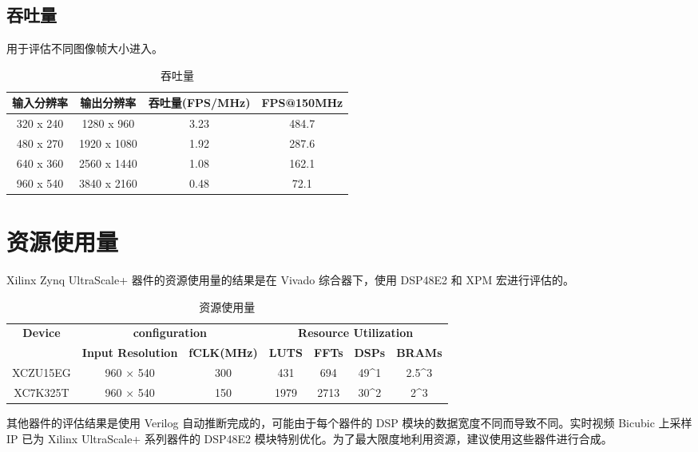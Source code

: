 \documentclass[12pt, a4paper, oneside]{ctexbook}
\begin{document}
		\subsection{吞吐量}
		用于评估不同图像帧大小进入。
		\begin{table}[h]
			\centering
			\begin{tabular}{|c|c|c|c|}
				\hline
				\textbf{输入分辨率} & \textbf{输出分辨率} & \textbf{吞吐量(FPS/MHz)} & \textbf{FPS@150MHz} \\ \hline
				320 x 240      & 1280 x 960     & 3.23                  & 484.7               \\ \hline
				480 x 270      & 1920 x 1080    & 1.92                  & 287.6               \\ \hline
				640 x 360      & 2560 x 1440    & 1.08                  & 162.1               \\ \hline
				960 x 540      & 3840 x 2160    & 0.48                  & 72.1                \\ \hline
			\end{tabular}
		\caption{吞吐量}
		\end{table}
	\section{资源使用量}
	Xilinx Zynq UltraScale+ 器件的资源使用量的结果是在 Vivado 综合器下，使用 DSP48E2 和 XPM 宏进行评估的。
	\par	
	\begin{table}[h]
		\begin{tabular}{|c|cc|cccc|}
			\hline
			\multirow{2}{*}{\textbf{Device}} & \multicolumn{2}{c|}{\textbf{configuration}}                         & \multicolumn{4}{c|}{\textbf{Resource Utilization}}                                                                                            \\ \cline{2-7} 
			& \multicolumn{1}{c|}{\textbf{Input Resolution}} & \textbf{fCLK(MHz)} & \multicolumn{1}{c|}{\textbf{LUTS}} & \multicolumn{1}{c|}{\textbf{FFTs}} & \multicolumn{1}{c|}{\textbf{DSPs}}         & \textbf{BRAMs}         \\ \hline
			XCZU15EG                         & \multicolumn{1}{c|}{960 × 540}                 & 300                & \multicolumn{1}{c|}{431}           & \multicolumn{1}{c|}{694}           & \multicolumn{1}{c|}{49\textasciicircum{}1} & 2.5\textasciicircum{}3 \\ \hline
			XC7K325T                         & \multicolumn{1}{c|}{960 × 540}                 & 150                & \multicolumn{1}{c|}{1979}          & \multicolumn{1}{c|}{2713}          & \multicolumn{1}{c|}{30\textasciicircum{}2} & 2\textasciicircum{}3   \\ \hline
		\end{tabular}
	\caption{资源使用量}
	\end{table}
	其他器件的评估结果是使用 Verilog 自动推断完成的，可能由于每个器件的 DSP 模块的数据宽度不同而导致不同。实时视频 Bicubic 上采样 IP 已为 Xilinx UltraScale+ 系列器件的 DSP48E2 模块特别优化。为了最大限度地利用资源，建议使用这些器件进行合成。
	
\end{document}
